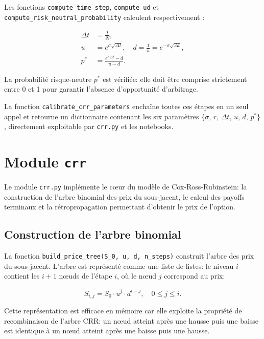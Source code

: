 \documentclass[11pt]{report}
\begin{document}
Les fonctions \texttt{compute\_time\_step}, \texttt{compute\_ud} et
\texttt{compute\_risk\_neutral\_probability} calculent respectivement :

\begin{align*}
\Delta t &= \frac{T}{N}, \\
u &= e^{\sigma \sqrt{\Delta t}}, \quad d = \frac{1}{u} = e^{-\sigma \sqrt{\Delta t}}, \\
p^* &= \frac{e^{r\,\Delta t} - d}{u - d}.
\end{align*}

La probabilité risque-neutre $p^*$ est vérifiée: elle doit être comprise
strictement entre 0 et 1 pour garantir l'absence d'opportunité d'arbitrage.

La fonction \texttt{calibrate\_crr\_parameters} enchaîne toutes ces étapes en un seul appel
et retourne un dictionnaire contenant les six paramètres
$\{\sigma,\, r,\, \Delta t,\, u,\, d,\, p^*\}$,
directement exploitable par \texttt{crr.py} et les notebooks.

\section{Module \texttt{crr}}

Le module \texttt{crr.py} implémente le cœur du modèle de Cox-Ross-Rubinstein:
la construction de l'arbre binomial des prix du sous-jacent, le calcul des
payoffs terminaux et la rétropropagation permettant d'obtenir le prix de l'option.

\subsection{Construction de l'arbre binomial}

La fonction \texttt{build\_price\_tree(S\_0, u, d, n\_steps)} construit l'arbre
des prix du sous-jacent. L'arbre est représenté comme une liste de listes:
le niveau $i$ contient les $i+1$ nœuds de l'étape $i$, où le nœud $j$
correspond au prix:

\[
S_{i,j} = S_0 \cdot u^j \cdot d^{i-j}, \quad 0 \leq j \leq i.
\]

Cette représentation est efficace en mémoire car elle exploite la propriété de
recombinaison de l'arbre CRR: un nœud atteint après une hausse puis une baisse
est identique à un nœud atteint après une baisse puis une hausse.
\end{document}
